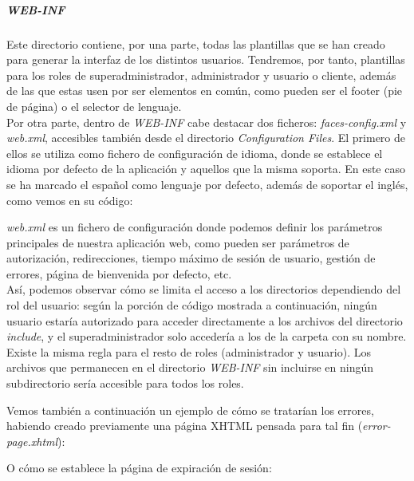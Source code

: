 \subparagraph{\textit{WEB-INF}}

Este directorio contiene, por una parte, todas las plantillas que se han creado para generar la interfaz de los distintos usuarios. Tendremos, por tanto, plantillas para los roles de superadministrador, administrador y usuario o cliente, además de las que estas usen por ser elementos en común, como pueden ser el footer (pie de página) o el selector de lenguaje. \\

Por otra parte, dentro de \textit{WEB-INF} cabe destacar dos ficheros: \textit{faces-config.xml} y \textit{web.xml}, accesibles también desde el directorio \textit{Configuration Files}. El primero de ellos se utiliza como fichero de configuración de idioma, donde se establece el idioma por defecto de la aplicación y aquellos que la misma soporta. En este caso se ha marcado el español como lenguaje por defecto, además de soportar el inglés, como vemos en su código: 

 \label{file:faces-config}

\textit{web.xml} es un fichero de configuración donde podemos definir los parámetros principales de nuestra aplicación web, como pueden ser parámetros de autorización, redirecciones, tiempo máximo de sesión de usuario, gestión de errores, página de bienvenida por defecto, etc. \\

Así, podemos observar cómo se limita el acceso a los directorios dependiendo del rol del usuario: según la porción de código mostrada a continuación, ningún usuario estaría autorizado para acceder directamente a los archivos del directorio \textit{include}, y el superadministrador solo accedería a los de la carpeta con su nombre. Existe la misma regla para el resto de roles (administrador y usuario). Los archivos que permanecen en el directorio \textit{WEB-INF} sin incluirse en ningún subdirectorio sería accesible para todos los roles.



Vemos también a continuación un ejemplo de cómo se tratarían los errores, habiendo creado previamente una página XHTML pensada para tal fin (\textit{error-page.xhtml}):



O cómo se establece la página de expiración de sesión:

